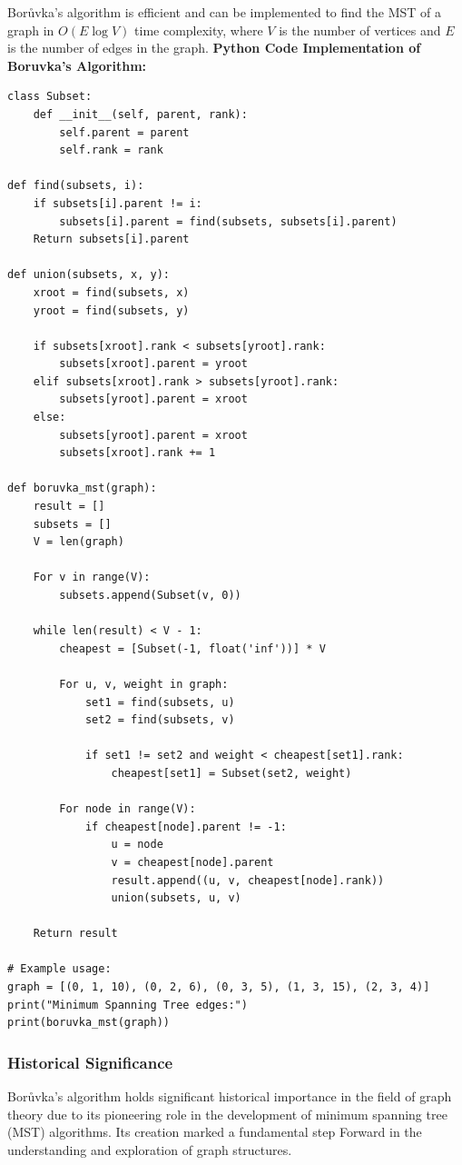 \documentclass[12pt]{book} %
\begin{document}
Borůvka's algorithm is efficient and can be implemented to find the MST of a graph in \( O(E \log V) \) time complexity, where \( V \) is the number of vertices and \( E \) is the number of edges in the graph.
\FloatBarrier
\textbf{Python Code Implementation of Boruvka's Algorithm:}
\FloatBarrier
\begin{lstlisting}
class Subset:
    def __init__(self, parent, rank):
        self.parent = parent
        self.rank = rank

def find(subsets, i):
    if subsets[i].parent != i:
        subsets[i].parent = find(subsets, subsets[i].parent)
    Return subsets[i].parent

def union(subsets, x, y):
    xroot = find(subsets, x)
    yroot = find(subsets, y)

    if subsets[xroot].rank < subsets[yroot].rank:
        subsets[xroot].parent = yroot
    elif subsets[xroot].rank > subsets[yroot].rank:
        subsets[yroot].parent = xroot
    else:
        subsets[yroot].parent = xroot
        subsets[xroot].rank += 1

def boruvka_mst(graph):
    result = []
    subsets = []
    V = len(graph)
    
    For v in range(V):
        subsets.append(Subset(v, 0))

    while len(result) < V - 1:
        cheapest = [Subset(-1, float('inf'))] * V

        For u, v, weight in graph:
            set1 = find(subsets, u)
            set2 = find(subsets, v)

            if set1 != set2 and weight < cheapest[set1].rank:
                cheapest[set1] = Subset(set2, weight)

        For node in range(V):
            if cheapest[node].parent != -1:
                u = node
                v = cheapest[node].parent
                result.append((u, v, cheapest[node].rank))
                union(subsets, u, v)

    Return result

# Example usage:
graph = [(0, 1, 10), (0, 2, 6), (0, 3, 5), (1, 3, 15), (2, 3, 4)]
print("Minimum Spanning Tree edges:")
print(boruvka_mst(graph))
\end{lstlisting}
\subsubsection{Historical Significance}
Borůvka's algorithm holds significant historical importance in the field of graph theory due to its pioneering role in the development of minimum spanning tree (MST) algorithms. Its creation marked a fundamental step Forward in the understanding and exploration of graph structures.
\end{document}
